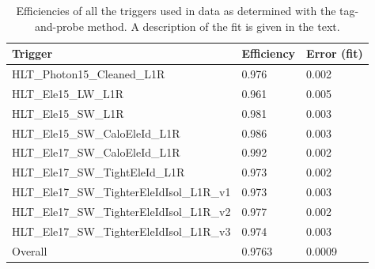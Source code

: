 



\begin{table}[htbp]
  \begin{center}
    \caption[\fixspacing Efficiencies of data trigger paths]
    {\fixspacing Efficiencies of all the triggers used in data 
    as determined with the tag-and-probe method. 
    A description of the fit is given in the text.}
    \label{TableTriggerEfficiencies}
    \begin{tabular}[]{ | l | l | l | }
      \hline
      Trigger	& Efficiency & Error (fit) \\ \hline \hline
      HLT\_Photon15\_Cleaned\_L1R & 0.976 & 0.002 \\ \hline
      HLT\_Ele15\_LW\_L1R & 0.961 & 0.005 \\ \hline
      HLT\_Ele15\_SW\_L1R & 0.981 & 0.003 \\ \hline
      HLT\_Ele15\_SW\_CaloEleId\_L1R & 0.986 & 0.003 \\ \hline
      HLT\_Ele17\_SW\_CaloEleId\_L1R & 0.992 & 0.002 \\ \hline
      HLT\_Ele17\_SW\_TightEleId\_L1R & 0.973 & 0.002 \\ \hline
      HLT\_Ele17\_SW\_TighterEleIdIsol\_L1R\_v1 & 0.973 & 0.003 \\ \hline
      HLT\_Ele17\_SW\_TighterEleIdIsol\_L1R\_v2 & 0.977 & 0.002 \\ \hline
      HLT\_Ele17\_SW\_TighterEleIdIsol\_L1R\_v3 & 0.974 & 0.003 \\ \hline
      Overall & 0.9763 & 0.0009 \\ \hline
    \end{tabular}
  \end{center}
\end{table}

\clearpage
